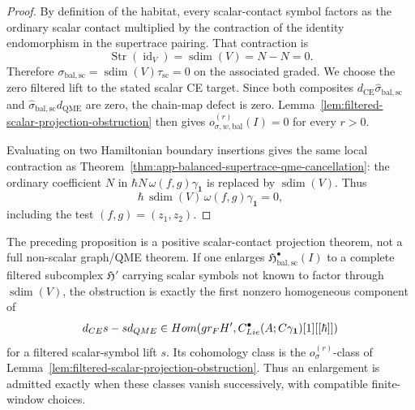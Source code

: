\begin{proof}
  By definition of the habitat, every scalar-contact symbol factors as
  the ordinary scalar contact multiplied by the contraction of the
  identity endomorphism in the supertrace pairing.  That contraction is
  \[
    \operatorname{Str}(\operatorname{id}_V)
      =
    \operatorname{sdim}(V)=N-N=0 .
  \]
  Therefore
  \(\sigma_{\mathrm{bal,sc}}
    =\operatorname{sdim}(V)\tau_{\mathrm{sc}}=0\) on the associated
  graded.  We choose the zero filtered lift to the stated scalar CE
  target.  Since both composites
  \(d_{\mathrm{CE}}\widehat\sigma_{\mathrm{bal,sc}}\) and
  \(\widehat\sigma_{\mathrm{bal,sc}}d_{\mathrm{QME}}\) are zero, the
  chain-map defect is zero.  Lemma~\ref{lem:filtered-scalar-projection-obstruction}
  then gives \(o^{(r)}_{\sigma,w,\mathrm{bal}}(I)=0\) for every
  \(r>0\).

  Evaluating on two Hamiltonian boundary insertions gives the same local
  contraction as Theorem~\ref{thm:app-balanced-supertrace-qme-cancellation}:
  the ordinary coefficient \(N\) in
  \(\hbar N\,\omega(f,g)\gamma_{\mathbf 1}\) is replaced by
  \(\operatorname{sdim}(V)\).  Thus
  \[
    \hbar\,\operatorname{sdim}(V)\,
    \omega(f,g)\gamma_{\mathbf 1}=0,
  \]
  including the test \((f,g)=(z_1,z_2)\).
\end{proof}

\begin{rmk}
\label{rmk:app-balanced-projection-extension-obstruction}
  The preceding proposition is a positive scalar-contact projection
  theorem, not a full non-scalar graph/QME theorem.  If one enlarges
  \(\mathfrak H^\bullet_{\mathrm{bal,sc}}(I)\) to a complete filtered
  subcomplex \(\mathfrak H'\) carrying scalar symbols not known to factor
  through \(\operatorname{sdim}(V)\), the obstruction is exactly the
  first nonzero homogeneous component of
  \[
    d_{CE}s-sd_{QME}
      \in
    Hom\!\left(
      gr_{F}H',
      C^\bullet_{Lie}(A;C\gamma_{\mathbf 1})[1][[\hbar]]
    \right)
  \]
  for a filtered scalar-symbol lift \(s\).  Its cohomology class is the
  \(o_\sigma^{(r)}\)-class of
  Lemma~\ref{lem:filtered-scalar-projection-obstruction}.  Thus an
  enlargement is admitted exactly when these classes vanish successively,
  with compatible finite-window choices.
\end{rmk}

